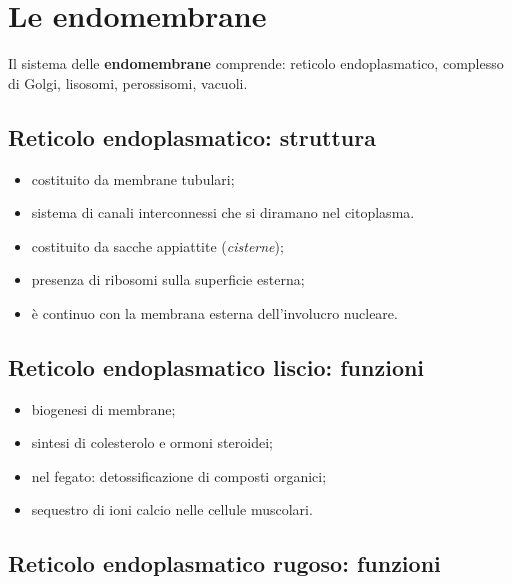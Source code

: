 \section{Le endomembrane}

Il sistema delle \textbf{endomembrane} comprende: reticolo endoplasmatico, complesso di Golgi, lisosomi, perossisomi, vacuoli.

\subsection{Reticolo endoplasmatico: struttura}

\begin{itemize}
  \item costituito da membrane tubulari;
  \item sistema di canali interconnessi che si diramano nel citoplasma.
\end{itemize}

\begin{itemize}
  \item costituito da sacche appiattite (\textit{cisterne});
  \item presenza di ribosomi sulla superficie esterna;
  \item è continuo con la membrana esterna dell'involucro nucleare.
\end{itemize}

\subsection{Reticolo endoplasmatico liscio: funzioni}

\begin{itemize}
  \item biogenesi di membrane;
  \item sintesi di colesterolo e ormoni steroidei;
  \item nel fegato: detossificazione di composti organici;
  \item sequestro di ioni calcio nelle cellule muscolari.
\end{itemize}

\subsection{Reticolo endoplasmatico rugoso: funzioni}

